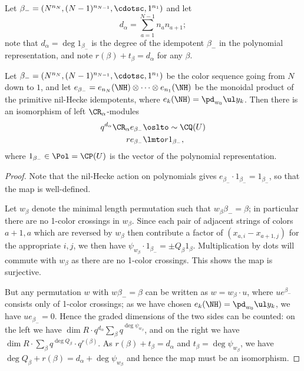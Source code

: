 \documentclass[11pt,reqno]{amsart}
\begin{document}
Let $\beta_-=(N^{n_N},(N-1)^{n_{N-1}},\cdotsc,1^{n_1})$ and let \[d_\alpha=\sum_{a=1}^{N-1}n_an_{a+1};\]  note that $d_\alpha=\deg 1_{\beta_-}$ is the degree of the idempotent $\beta_-$ in the polynomial representation, and note $r(\beta)+t_\beta=d_\alpha$ for any $\beta$. \begin{proposition}\label{prop:Q is antidom proj}
    Let $\beta_-=(N^{n_N},(N-1)^{n_{N-1}},\cdotsc,1^{n_1})$ be the color sequence going from $N$ down to $1$, and let $e_{\beta_-}=e_{n_N}(\NH)\otimes\cdots\otimes e_{n_1}(\NH)$ be the monoidal product of the primitive nil-Hecke idempotents, where $e_k(\NH)=\pd_{w_0}\ul y_k$. Then there is an isomorphism of left $\CR_\alpha$-modules
    \begin{align*}
        q^{d_\alpha}\CR_\alpha e_{\beta_-}&\simlto \CQ(U)\\
        r e_{\beta_-}&\lmto r 1_{\beta_-},
    \end{align*}
    where $1_{\beta_-}\in\Pol=\CP(U)$ is the vector of the polynomial representation.
\end{proposition}
\begin{proof}
    Note that the nil-Hecke action on polynomials gives $e_{\beta_-}\cdot 1_{\beta_-}=1_{\beta_-}$, so that the map is well-defined.

    Let $w_\beta$ denote the minimal length permutation such that $w_\beta \beta_-=\beta$; in particular there are no 1-color crossings in $w_\beta$. Since each pair of adjacent strings of colors $a+1,a$ which are reversed by $w_\beta$ then contribute a factor of $(x_{a,i}-x_{a+1,j})$ for the appropriate $i,j$, we then have $\psi_{w_\beta}\cdot 1_{\beta_-}=\pm Q_\beta 1_{\beta}$. Multiplication by dots will commute with $w_\beta$ as there are no 1-color crossings. This shows the map is surjective.

    But any permutation $w$ with $w \beta_-=\beta$ can be written as $w=w_\beta\cdot u$, where $u e^{\beta_-}$ consists only of 1-color crossings; as we have chosen $e_k(\NH)=\pd_{w_0}\ul y_k$, we have $u e_{\beta_-}=0$. Hence the graded dimensions of the two sides can be counted: on the left we have $\dim R\cdot q^{d_\alpha}\sum_{\beta} q^{\deg \psi_{w_\beta}}$, and on the right we have $\dim R\cdot \sum_\beta q^{\deg Q_\beta}\cdot q^{r(\beta)}$. As $r(\beta)+t_\beta=d_\alpha$ and $t_\beta=\deg \psi_{w_\beta}$, we have $\deg Q_\beta+r(\beta)=d_\alpha+\deg\psi_{w_\beta}$ and hence the map must be an isomorphism.
\end{proof}
\end{document}
